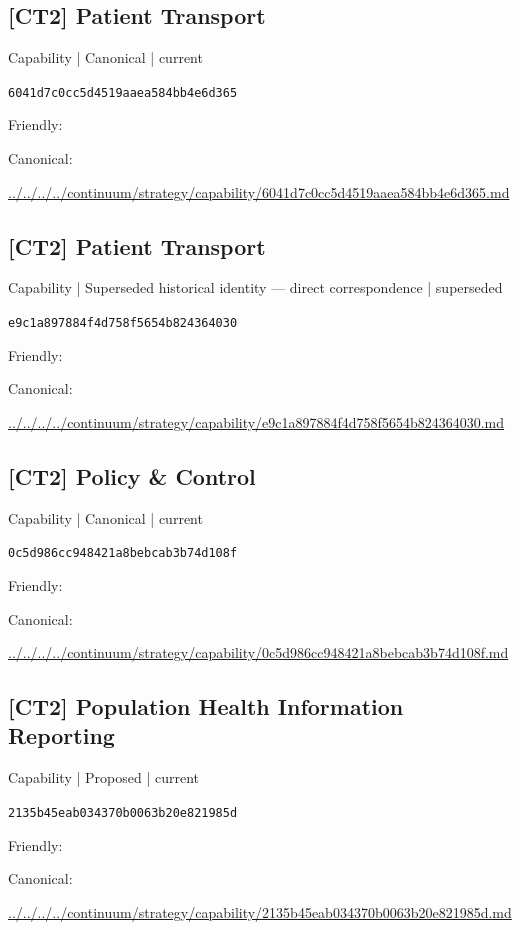 \documentclass[10pt,a4paper]{article}
\begin{document}
\subsection*{[CT2] Patient Transport}
{\small Capability | Canonical | current}\par
\texttt{6041d7c0cc5d4519aaea584bb4e6d365}\par
Friendly: \par
Canonical: \par
{\footnotesize\url{../../../../continuum/strategy/capability/6041d7c0cc5d4519aaea584bb4e6d365.md}}\par
\subsection*{[CT2] Patient Transport}
{\small Capability | Superseded historical identity — direct correspondence | superseded}\par
\texttt{e9c1a897884f4d758f5654b824364030}\par
Friendly: \par
Canonical: \par
{\footnotesize\url{../../../../continuum/strategy/capability/e9c1a897884f4d758f5654b824364030.md}}\par
\subsection*{[CT2] Policy \& Control}
{\small Capability | Canonical | current}\par
\texttt{0c5d986cc948421a8bebcab3b74d108f}\par
Friendly: \par
Canonical: \par
{\footnotesize\url{../../../../continuum/strategy/capability/0c5d986cc948421a8bebcab3b74d108f.md}}\par
\subsection*{[CT2] Population Health Information Reporting}
{\small Capability | Proposed | current}\par
\texttt{2135b45eab034370b0063b20e821985d}\par
Friendly: \par
Canonical: \par
{\footnotesize\url{../../../../continuum/strategy/capability/2135b45eab034370b0063b20e821985d.md}}\par
\end{document}
